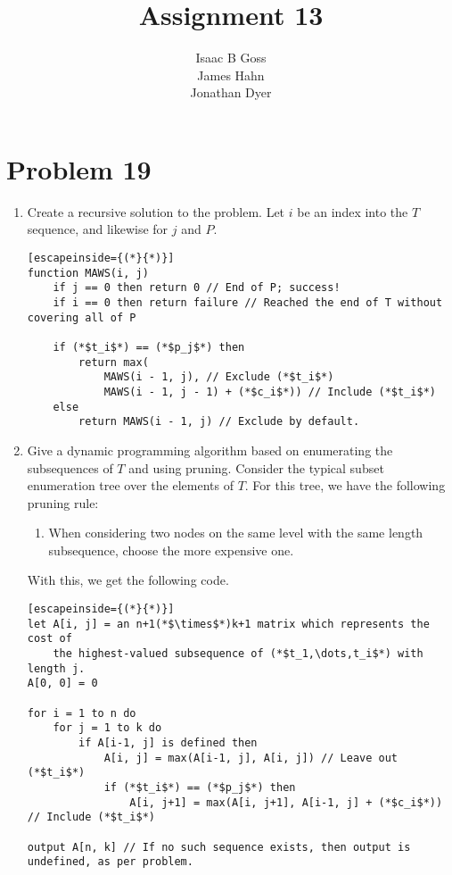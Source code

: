 \documentclass{article}
\author{Isaac B Goss\\ James Hahn\\ Jonathan Dyer}
\title{Assignment 13}
\providecommand{\prob}[1]{\section*{Problem #1}}
\begin{document}
\maketitle

    \prob{19}
    \begin{enumerate}[label=(\alph*)]
        \item Create a recursive solution to the problem.
            Let $i$ be an index into the $T$ sequence, and likewise for $j$ and $P$.
            \begin{lstlisting}[escapeinside={(*}{*)}]
function MAWS(i, j)
    if j == 0 then return 0 // End of P; success!
    if i == 0 then return failure // Reached the end of T without covering all of P

    if (*$t_i$*) == (*$p_j$*) then
        return max(
            MAWS(i - 1, j), // Exclude (*$t_i$*)
            MAWS(i - 1, j - 1) + (*$c_i$*)) // Include (*$t_i$*)
    else
        return MAWS(i - 1, j) // Exclude by default.
            \end{lstlisting}
        \item Give a dynamic programming algorithm based on enumerating the subsequences of $T$ and using pruning.
            Consider the typical subset enumeration tree over the elements of $T$.
            For this tree, we have the following pruning rule:
            \begin{enumerate}[label=\arabic*.]
                \item When considering two nodes on the same level with the same length subsequence, choose the more expensive one.
            \end{enumerate}

            With this, we get the following code.
            \begin{lstlisting}[escapeinside={(*}{*)}]
let A[i, j] = an n+1(*$\times$*)k+1 matrix which represents the cost of
    the highest-valued subsequence of (*$t_1,\dots,t_i$*) with length j.
A[0, 0] = 0

for i = 1 to n do
    for j = 1 to k do
        if A[i-1, j] is defined then
            A[i, j] = max(A[i-1, j], A[i, j]) // Leave out (*$t_i$*)
            if (*$t_i$*) == (*$p_j$*) then
                A[i, j+1] = max(A[i, j+1], A[i-1, j] + (*$c_i$*)) // Include (*$t_i$*)

output A[n, k] // If no such sequence exists, then output is undefined, as per problem.
            \end{lstlisting}
            \pagebreak


\end{enumerate}
\end{document}
